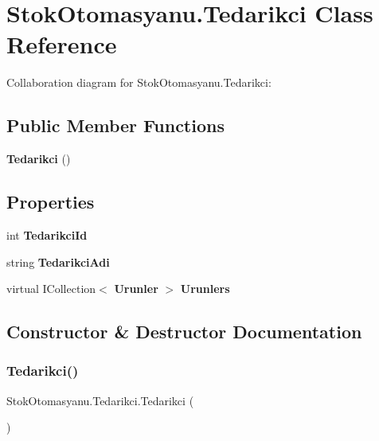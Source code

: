 \section{Stok\+Otomasyanu.\+Tedarikci Class Reference}
\label{class_stok_otomasyanu_1_1_tedarikci}


Collaboration diagram for Stok\+Otomasyanu.\+Tedarikci\+:
\subsection*{Public Member Functions}
\begin{DoxyCompactItemize}
\item 
\textbf{ Tedarikci} ()
\end{DoxyCompactItemize}
\subsection*{Properties}
\begin{DoxyCompactItemize}
\item 
int \textbf{ Tedarikci\+Id}\hspace{0.3cm}{\ttfamily  [get, set]}
\item 
string \textbf{ Tedarikci\+Adi}\hspace{0.3cm}{\ttfamily  [get, set]}
\item 
virtual I\+Collection$<$ \textbf{ Urunler} $>$ \textbf{ Urunlers}\hspace{0.3cm}{\ttfamily  [get, set]}
\end{DoxyCompactItemize}


\subsection{Constructor \& Destructor Documentation}
\mbox{\label{class_stok_otomasyanu_1_1_tedarikci_af2fabab56deccdcceaf5e2c180cd5862}} 
\subsubsection{Tedarikci()}
{\footnotesize\ttfamily Stok\+Otomasyanu.\+Tedarikci.\+Tedarikci (\begin{DoxyParamCaption}{ }\end{DoxyParamCaption})}



